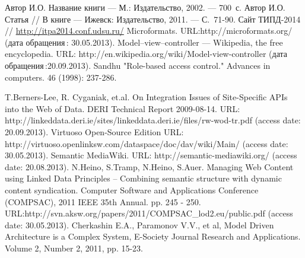 \documentclass[utf8]{../IncArticle}
\begin{document}
\begin{thebibliography}{11}
 Автор И.О. Название книги --- М.: Издательство, 2002. --- 700~с.
 Автор И.О. Статья // В книге --- Ижевск: Издательство, 2011. --- С.~71-90.
 Сайт ТИПД-2014 // \url{http://itpa2014.conf.udsu.ru/}
 Microformats. URL:http://microformats.org/ (дата обращения\,: 30.05.2013).
 Model–view–controller --- Wikipedia, the free encyclopedia. URL: http://en.wikipedia.org/wiki/Model-view-controller (дата обращения\,:20.09.2013).
 Sandhu "Role-based access control." Advances in computers. 46 (1998): 237-286.

 T.Berners-Lee, R. Cyganiak, et.al. On Integration Issues of Site-Specific APIs into the Web of Data. DERI Technical Report 2009-08-14. URL: http://linkeddata.deri.ie/sites/linkeddata.deri.ie/files/rw-wod-tr.pdf (access date: 20.09.2013).
 Virtuoso Open-Source Edition URL: http://virtuoso.openlinksw.com/dataspace/doc/dav/wiki/Main/ (access date: 30.05.2013).
 Semantic MediaWiki. URL: http://semantic-mediawiki.org/ (access date: 20.08.2013).
 N.Heino, S.Tramp, N.Heino, S.Auer. Managing Web
  Content using Linked Data Principles – Combining semantic structure
  with dynamic content syndication. Computer Software and Applications
  Conference (COMPSAC), 2011 IEEE 35th Annual. pp. 245 -
  250. URL:http://svn.aksw.org/papers/2011/COMPSAC\_lod2.eu/public.pdf
  (access date: 30.05.2013).
 Cherkashin E.A., Paramonov V.V., et al, Model Driven Architecture is a Complex System, E-Society Journal Research and Applications. Volume 2, Number 2, 2011, pp. 15-23.
\end{thebibliography}

\end{document}

